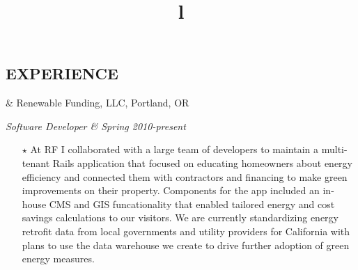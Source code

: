 \documentclass[11pt]{res} %
\begin{document}

  \address{ {\bf CONTACT INFORMATION} \\
    \href{mailto:laurie.kemmerer@gmail.com}{laurie.kemmerer@gmail.com} \\
    (503) 866-4437
  }
  \address{ \\
    \url{http://github.com/lkemmerer} \\
    \href{http://twitter.com/im\_a\_radish}{@im\_a\_radish}
  }

  \begin{resume}

    \section{EXPERIENCE}
    \begin{ncolumn}{2}
	    & \hfill {}Renewable Funding, LLC, Portland, OR \\
	    \title{l} \itshape Software Developer & \hfill{}Spring 2010-present \\
    \end{ncolumn}
    \begin{itemize} \itemsep -2pt
	    \item[$\star$]At RF I collaborated with a large team of developers to maintain a multi-tenant Rails application that focused on educating homeowners about energy efficiency and connected them with contractors and financing to make green improvements on their property.  Components for the app included an in-house CMS and GIS funcationality that enabled tailored energy and cost savings calculations to our visitors.  We are currently standardizing energy retrofit data from local governments and utility providers for California with plans to use the data warehouse we create to drive further adoption of green energy measures.
    \end{itemize}


\end{resume}
\end{document}
